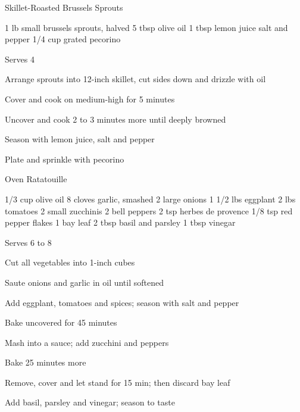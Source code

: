 \begin{recipe}{Skillet-Roasted Brussels Sprouts}{\vegetarian{}}
\begin{ingredients}
1 lb small brussels sprouts, halved
5 tbsp olive oil
1 tbsp lemon juice
salt and pepper
1/4 cup grated \ibreak pecorino
\end{ingredients}
\nextcolumn
Serves 4
\begin{steps}
    \item Arrange sprouts into 12-inch skillet, cut sides down and drizzle with oil
    \item Cover and cook on medium-high for 5 minutes
    \item Uncover and cook 2 to 3 minutes more until deeply browned
    \item Season with lemon juice, salt and pepper
    \item Plate and sprinkle with pecorino
\end{steps}
\end{recipe}

\begin{denserecipe}{Oven Ratatouille}{\vegetarian{}}
\begin{ingredients}
1/3 cup olive oil
8 cloves garlic, smashed
2 large onions
1 1/2 lbs eggplant
2 lbs tomatoes
2 small zucchinis
2 bell peppers
2 tsp herbes de provence
1/8 tsp red pepper flakes
1 bay leaf
2 tbsp basil and parsley
1 tbsp vinegar
\end{ingredients}
\nextcolumn
Serves 6 to 8
\begin{steps}
    \item Cut all vegetables into 1-inch cubes
    \item Saute onions and garlic in oil until softened
    \item Add eggplant, tomatoes and spices; season with salt and pepper
    \item Bake uncovered for 45 minutes
    \item Mash into a sauce; add zucchini and peppers
    \item Bake 25 minutes more
    \item Remove, cover and let stand for 15 min; then discard bay leaf
    \item Add basil, parsley and vinegar; season to taste
\end{steps}
\end{denserecipe}

